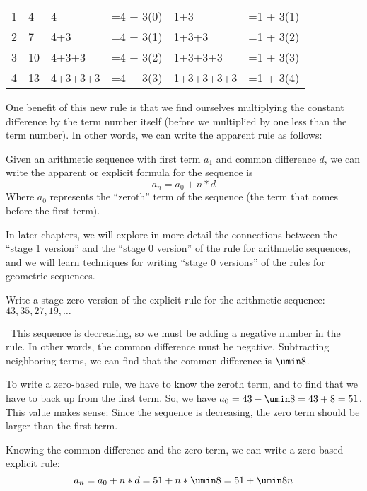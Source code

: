 \begin{center}\begin{tabular}{C{1cm}C{1cm}|L{3cm}L{2cm}|L{3cm}L{2cm}}
& &  &&  &
\\ & 4
& 4 & =4 + 3(0)
& 1+3 & =1 + 3(1)
\\
2 & 7
& 4+3 & =4 + 3(1)
& 1+3+3 & =1 + 3(2)
\\
3 & 10
& 4+3+3 & =4 + 3(2)
& 1+3+3+3 & =1 + 3(3)
\\
4 & 13
& 4+3+3+3 & =4 + 3(3)
& 1+3+3+3+3 & =1 + 3(4)
\\
\end{tabular}\end{center}

One benefit of this new rule is that we find ourselves multiplying the constant difference by the term number itself (before we multiplied by one less than the term number). In other words, we can write the apparent rule as follows:

\begin{boxeddef}
Given an arithmetic sequence with first term $a_1$ and common difference $d$, we can write the apparent or explicit formula for the sequence is \[a_n = a_0 + n \ast d\] Where $a_0$ represents the ``zeroth'' term of the sequence (the term that comes before the first term).
\end{boxeddef}

In later chapters, we will explore in more detail the connections between the ``stage 1 version'' and the ``stage 0 version'' of the rule for arithmetic sequences, and we will learn techniques for writing ``stage 0 versions'' of the rules for geometric sequences.

\begin{boxedex}
Write a stage zero version of the explicit rule for the arithmetic sequence: $43, 35, 27, 19, \dotsc$

\exsoln\ This sequence is decreasing, so we must be adding a negative number in the rule. In other words, the common difference must be negative. Subtracting neighboring terms, we can find that the common difference is $\umin8$.

To write a zero-based rule, we have to know the zeroth term, and to find that we have to back up from the first term. So, we have $a_0 = 43 - \umin8 = 43 + 8 = 51$. This value makes sense: Since the sequence is decreasing, the zero term should be larger than the first term.

Knowing the common difference and the zero term, we can write a zero-based explicit rule: \[a_n = a_0 + n \ast d = 51 + n \ast \umin8 = 51 + \umin8n\]
\end{boxedex}

